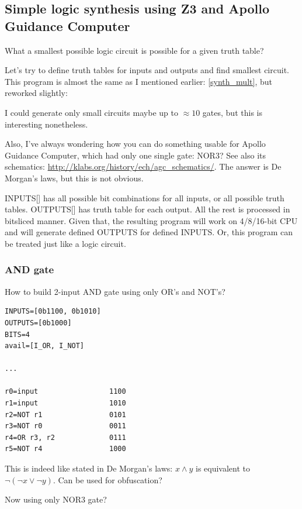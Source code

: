 \subsection{Simple logic synthesis using Z3 and Apollo Guidance Computer}

What a smallest possible logic circuit is possible for a given truth table?

Let's try to define truth tables for inputs and outputs and find smallest circuit.
This program is almost the same as I mentioned earlier: \ref{synth_mult}, but reworked slightly:



I could generate only small circuits maybe up to $\approx 10$ gates, but this is interesting nonetheless.

Also, I've always wondering how you can do something usable for Apollo Guidance Computer,
which had only one single gate: NOR3?
See also its schematics: \url{http://klabs.org/history/ech/agc_schematics/}.
The answer is De Morgan's laws, but this is not obvious.

INPUTS[] has all possible bit combinations for all inputs, or all possible truth tables. OUTPUTS[] has truth table for each output.
All the rest is processed in bitsliced manner.
Given that, the resulting program will work on 4/8/16-bit CPU and will generate defined OUTPUTS for defined INPUTS.
Or, this program can be treated just like a logic circuit.

\subsubsection{AND gate}

How to build 2-input AND gate using only OR's and NOT's?

\begin{lstlisting}
INPUTS=[0b1100, 0b1010]
OUTPUTS=[0b1000]
BITS=4
avail=[I_OR, I_NOT]

...

r0=input                 1100
r1=input                 1010
r2=NOT r1                0101
r3=NOT r0                0011
r4=OR r3, r2             0111
r5=NOT r4                1000
\end{lstlisting}

This is indeed like stated in De Morgan's laws: $x \wedge y$ is equivalent to $\neg (\neg x \vee \neg y)$.
Can be used for obfuscation?

Now using only NOR3 gate?

